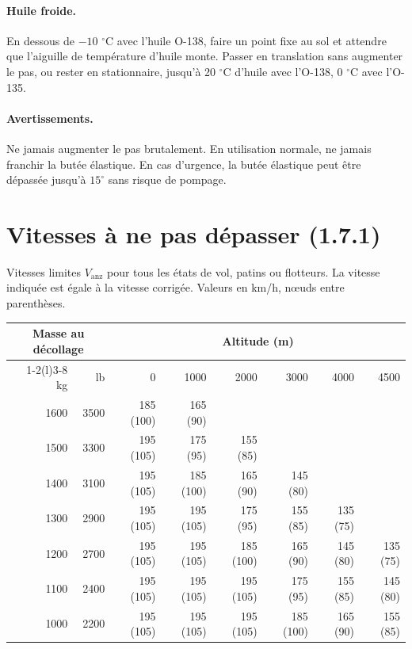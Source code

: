 \documentclass[a4paper,12pt]{article}
\renewcommand{\deg}[1]{$#1^{\circ}$}  %
\begin{document}
\paragraph{Huile froide.} En dessous de $-10$ \deg{}C avec l'huile O-138,
faire un point fixe au sol et attendre que l'aiguille de température
d'huile monte. Passer en translation sans augmenter le pas, ou rester en
stationnaire, jusqu'à 20 \deg{}C d'huile avec l'O-138, 0 \deg{}C avec
l'O-135.

\paragraph{Avertissements.} Ne jamais augmenter le pas brutalement. En
utilisation normale, ne jamais franchir la butée élastique. En cas
d'urgence, la butée élastique peut être dépassée jusqu'à \deg{15} sans
risque de pompage.

\section{Vitesses à ne pas dépasser (1.7.1)}

Vitesses limites $V_{\text{anz}}$ pour tous les états de vol, patins ou
flotteurs. La vitesse indiquée est égale à la vitesse corrigée. Valeurs en
km/h, nœuds entre parenthèses.

\begin{center}
\small
\begin{tabular}{@{}rrrrrrrr@{}}
\toprule
\multicolumn{2}{c}{Masse au décollage} & \multicolumn{6}{c}{Altitude (m)} \\
\cmidrule(lr){1-2}\cmidrule(l){3-8}
kg & lb & 0 & 1000 & 2000 & 3000 & 4000 & 4500 \\
\midrule
1600 & 3500 & 185 (100) & 165 (90) & & & & \\
1500 & 3300 & 195 (105) & 175 (95) & 155 (85) & & & \\
1400 & 3100 & 195 (105) & 185 (100) & 165 (90) & 145 (80) & & \\
1300 & 2900 & 195 (105) & 195 (105) & 175 (95) & 155 (85) & 135 (75) & \\
1200 & 2700 & 195 (105) & 195 (105) & 185 (100) & 165 (90) & 145 (80) & 135 (75) \\
1100 & 2400 & 195 (105) & 195 (105) & 195 (105) & 175 (95) & 155 (85) & 145 (80) \\
1000 & 2200 & 195 (105) & 195 (105) & 195 (105) & 185 (100) & 165 (90) & 155 (85) \\
\bottomrule
\end{tabular}
\end{center}
\end{document}
